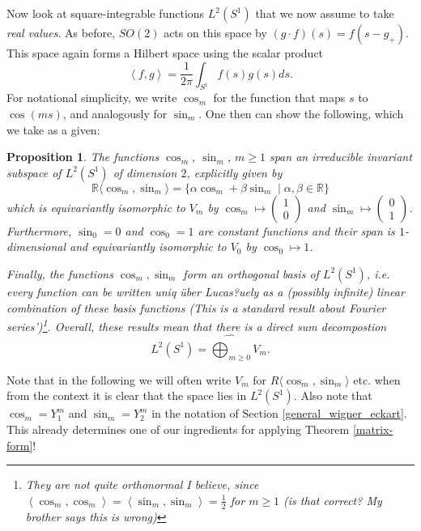\documentclass[12pt, a4paper]{article}
\theoremstyle{plain}
\newtheorem{pro}{Proposition}[section]
\theoremstyle{definition}
\theoremstyle{remark}
\newcommand{\R}{\mathds{R}}
\begin{document}
Now look at square-integrable functions $L^2(S^1)$ that we now assume to take \emph{real values}. As before, $SO(2)$ acts on this space by $(g \cdot f)(s) = f(s - g_{+})$. This space again forms a Hilbert space using the scalar product
\begin{equation*}
\left\langle f, g\right\rangle = \frac{1}{2 \pi} \int_{S^1} f(s) g(s) ds.
\end{equation*}
For notational simplicity, we write $\cos_m$ for the function that maps $s$ to $\cos(ms)$, and analogously for $\sin_m$. One then can show the following, which we take as a given:

\begin{pro}\label{description_L_1}
The functions $\cos_m$, $\sin_m$, $m \geq 1$ span an irreducible invariant subspace of $L^2(S^1)$ of dimension $2$, explicitly given by
\begin{equation*}
\R\langle \cos_m, \sin_m \rangle = \{\alpha \cos_m + \beta \sin_m \mid \alpha, \beta \in \R \}
\end{equation*}
which is equivariantly isomorphic to $V_m$ by $\cos_m \mapsto \begin{pmatrix} 1 \\ 0\end{pmatrix}$ and $\sin_m \mapsto \begin{pmatrix} 0 \\ 1 \end{pmatrix}$. Furthermore, $\sin_0 = 0$ and $\cos_0 = 1$ are constant functions and their span is $1$-dimensional and equivariantly isomorphic to $V_0$ by $\cos_0 \mapsto 1$. 

Finally, the functions $\cos_m, \sin_m$ form an orthogonal basis of $L^2(S^1)$, i.e. every function can be written uniq über Lucas?uely as a (possibly infinite) linear combination of these basis functions (This is a standard result about Fourier series')\footnote{They are \emph{not quite} orthonormal I believe, since $\left\langle \cos_m, \cos_m \right\rangle = \left\langle \sin_m, \sin_m\right\rangle = \frac{1}{2}$ for $m \geq 1$ (is that correct? My brother says this is wrong)}. Overall, these results mean that there is a direct sum decompostion
\begin{equation*}
L^2(S^1) = \widehat{\bigoplus_{m \geq 0}} V_m.
\end{equation*}
\end{pro}

Note that in the following we will often write $V_m$ for $R \langle \cos_m, \sin_m \rangle$ etc. when from the context it is clear that the space lies in $L^2(S^1)$. Also note that $\cos_m = Y^{m}_1$ and $\sin_m = Y^{m}_2$ in the notation of Section \ref{general_wigner_eckart}. This already determines one of our ingredients for applying Theorem \ref{matrix-form}!
\end{document}

